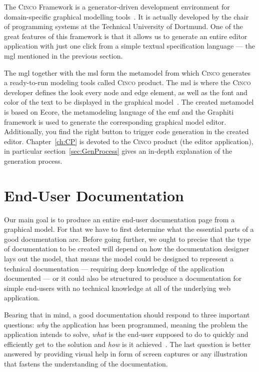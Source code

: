 The \textsc{Cinco} Framework is a generator-driven development environment for domain-specific graphical modelling tools~\cite{Cinco}. It is actually developed by the chair of programming systems at the Technical University of Dortmund. One of the great features of this framework is that it allows us to generate an entire editor application with just one click from a simple textual specification language --- the \acrfull{mgl} mentioned in the previous section. 

The \acrshort{mgl} together with the \acrshort{msl} form the metamodel from which \textsc{Cinco} generates a ready-to-run modeling tools called \textsc{Cinco} product. The \acrshort{msl} is where the \textsc{Cinco} developer defines the look every node and edge element, as well as the font and color of the text to be displayed in the graphical model~\cite{naujokat-diss}. The created metamodel is based on Ecore, the metamodeling language of the \acrfull{emf} and the Graphiti framework is used to generate the corresponding graphical model editor. Additionally, you find the right button to trigger code generation in the created editor. Chapter~\ref{ch:CP} is devoted to the \textsc{Cinco} product (the editor application), in particular section~\ref{sec:GenProcess} gives an in-depth explanation of the generation process.



\section{End-User Documentation}\label{sec:endUserDoc}

Our main goal is to produce an entire end-user documentation page from a graphical model. For that we have to first determine what the essential parts of a good documentation are. Before going further, we ought to precise that the type of documentation to be created will depend on how the documentation designer lays out the model, that means the model could be designed to represent a technical documentation --- requiring deep knowledge of the application documented --- or it could also be structured to produce a documentation for simple end-users with no technical knowledge at all of the underlying web application.

Bearing that in mind, a good documentation should respond to three important questions: \textit{why} the application has been programmed, meaning the problem the application intends to solve, \textit{what} is the end-user supposed to do to quickly and efficiently get to the solution and \textit{how} is it achieved~\cite{ISO-IEC-IEEE}. The last question is better answered by providing visual help in form of screen captures or any illustration that fastens the understanding of the documentation.

